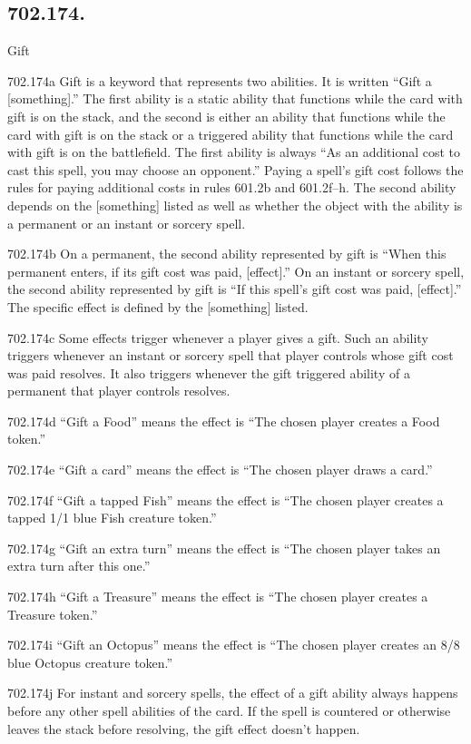 \subsection*{702.174.}
Gift

702.174a Gift is a keyword that represents two abilities. It is written “Gift a [something].” The first ability is a static ability that functions while the card with gift is on the stack, and the second is either an ability that functions while the card with gift is on the stack or a triggered ability that functions while the card with gift is on the battlefield. The first ability is always “As an additional cost to cast this spell, you may choose an opponent.” Paying a spell’s gift cost follows the rules for paying additional costs in rules 601.2b and 601.2f–h. The second ability depends on the [something] listed as well as whether the object with the ability is a permanent or an instant or sorcery spell.

702.174b On a permanent, the second ability represented by gift is “When this permanent enters, if its gift cost was paid, [effect].” On an instant or sorcery spell, the second ability represented by gift is “If this spell’s gift cost was paid, [effect].” The specific effect is defined by the [something] listed.

702.174c Some effects trigger whenever a player gives a gift. Such an ability triggers whenever an instant or sorcery spell that player controls whose gift cost was paid resolves. It also triggers whenever the gift triggered ability of a permanent that player controls resolves.

702.174d “Gift a Food” means the effect is “The chosen player creates a Food token.”

702.174e “Gift a card” means the effect is “The chosen player draws a card.”

702.174f “Gift a tapped Fish” means the effect is “The chosen player creates a tapped 1/1 blue Fish creature token.”

702.174g “Gift an extra turn” means the effect is “The chosen player takes an extra turn after this one.”

702.174h “Gift a Treasure” means the effect is “The chosen player creates a Treasure token.”

702.174i “Gift an Octopus” means the effect is “The chosen player creates an 8/8 blue Octopus creature token.”

702.174j For instant and sorcery spells, the effect of a gift ability always happens before any other spell abilities of the card. If the spell is countered or otherwise leaves the stack before resolving, the gift effect doesn’t happen.

